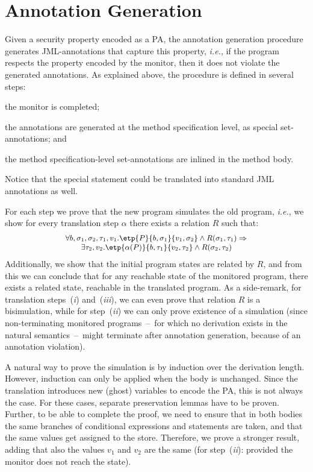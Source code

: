 \section{Annotation Generation}\label{SecAnnotGen}

Given a security property encoded as a PA, the annotation generation
procedure generates JML-annotations that capture this property,
\emph{i.e.}, if the program respects the property encoded by the
monitor, then it does not violate the generated annotations. As
explained above, the procedure is defined in several steps:
\begin{inparaenum}
\item the monitor is completed; %
\item the annotations are generated at the method specification level,
as special set-annotations; and
\item the method specification-level set-annotations are inlined in
the method body.
\end{inparaenum}
Notice that the special \CaseJML statement could be translated into
standard JML annotations as well.

For each step we prove that the new program simulates the old program,
\emph{i.e.}, we show for every translation step
\(\alpha\) there exists a relation \(R\) such that:
\[{\small
\begin{array}{l}
\forall b, \sigma_1, \sigma_2, \tau_1, v_1.
\etp{P}{b,\sigma_1}{v_1, \sigma_2} \wedge
R(\sigma_1, \tau_1) \Rightarrow \\
\qquad
\exists \tau_2, v_2.
\etp{\alpha(P)}{b, \tau_1}{v_2, \tau_2} \wedge
R(\sigma_2, \tau_2)
\end{array}}
\]
Additionally, we show that the initial program states are related by
\(R\), and from this we can conclude that for any reachable state of
the monitored program, there exists a related state, reachable in the
translated program. As a side-remark, for translation steps~(\emph{i})
and~(\emph{iii}), we can even prove that relation \(R\) is a
bisimulation, while for step~(\emph{ii}) we can only prove existence
of a simulation (since non-terminating monitored programs~--~for which
no derivation exists in the natural semantics~--~might terminate after
annotation generation, because of an annotation violation).

A natural way to prove the simulation is by induction over the
derivation length.  However, induction can only be applied when the
body is unchanged. Since the translation introduces new (ghost)
variables to encode the PA, this is not always the case. For these
cases, separate preservation lemmas have to be proven.  Further, to be
able to complete the proof, we need to ensure that in both bodies the
same branches of conditional expressions and statements are taken, and
that the same values get assigned to the store. Therefore, we prove a
stronger result, adding that also the values %
\(v_1\) and \(v_2\) are the same (for step~(\emph{ii}): provided the
monitor does not reach the \halted state).


